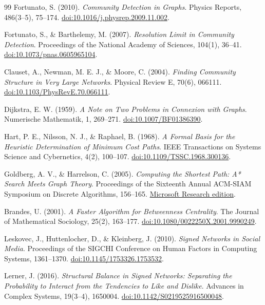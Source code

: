 \documentclass[a4paper,12pt]{report}
\begin{document}
\begin{thebibliography}{99}
Fortunato, S. (2010). \textit{Community Detection in Graphs}. Physics Reports, 486(3--5), 75--174. \href{https://doi.org/10.1016/j.physrep.2009.11.002}{doi:10.1016/j.physrep.2009.11.002}.

Fortunato, S., \& Barthelemy, M. (2007). \textit{Resolution Limit in Community Detection}. Proceedings of the National Academy of Sciences, 104(1), 36--41. \href{https://doi.org/10.1073/pnas.0605965104}{doi:10.1073/pnas.0605965104}.

Clauset, A., Newman, M. E. J., \& Moore, C. (2004). \textit{Finding Community Structure in Very Large Networks}. Physical Review E, 70(6), 066111. \href{https://doi.org/10.1103/PhysRevE.70.066111}{doi:10.1103/PhysRevE.70.066111}.

Dijkstra, E. W. (1959). \textit{A Note on Two Problems in Connexion with Graphs}. Numerische Mathematik, 1, 269--271. \href{https://doi.org/10.1007/BF01386390}{doi:10.1007/BF01386390}.

Hart, P. E., Nilsson, N. J., \& Raphael, B. (1968). \textit{A Formal Basis for the Heuristic Determination of Minimum Cost Paths}. IEEE Transactions on Systems Science and Cybernetics, 4(2), 100--107. \href{https://doi.org/10.1109/TSSC.1968.300136}{doi:10.1109/TSSC.1968.300136}.

Goldberg, A. V., \& Harrelson, C. (2005). \textit{Computing the Shortest Path: A* Search Meets Graph Theory}. Proceedings of the Sixteenth Annual ACM-SIAM Symposium on Discrete Algorithms, 156--165. \href{https://www.microsoft.com/en-us/research/publication/computing-the-shortest-path-a-search-meets-graph-theory/}{Microsoft Research edition}.

Brandes, U. (2001). \textit{A Faster Algorithm for Betweenness Centrality}. The Journal of Mathematical Sociology, 25(2), 163--177. \href{https://doi.org/10.1080/0022250X.2001.9990249}{doi:10.1080/0022250X.2001.9990249}.

Leskovec, J., Huttenlocher, D., \& Kleinberg, J. (2010). \textit{Signed Networks in Social Media}. Proceedings of the SIGCHI Conference on Human Factors in Computing Systems, 1361--1370. \href{https://doi.org/10.1145/1753326.1753532}{doi:10.1145/1753326.1753532}.

Lerner, J. (2016). \textit{Structural Balance in Signed Networks: Separating the Probability to Interact from the Tendencies to Like and Dislike}. Advances in Complex Systems, 19(3--4), 1650004. \href{https://doi.org/10.1142/S0219525916500048}{doi:10.1142/S0219525916500048}.


\end{thebibliography}
\end{document}
